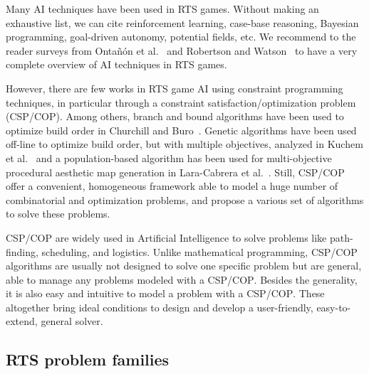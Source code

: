 \documentclass[journal]{IEEEtran}
\newcommand{\csp}{\textsc{CSP}\xspace}
\newcommand{\cop}{\textsc{COP}\xspace}
\begin{document}
Many AI  techniques have  been used  in RTS  games. Without  making an
exhaustive  list,  we  can   cite  reinforcement  learning,  case-base
reasoning,  Bayesian  programming,   goal-driven  autonomy,  potential
fields, etc. We  recommend to the reader  surveys from Onta{\~n}{\'o}n
et       al.~\cite{OntanonSURCM13}       and       Robertson       and
Watson~\cite{RobertsonW14}  to have  a  very complete  overview of  AI
techniques in RTS games.

However,  there  are  few  works  in  RTS  game  AI  using  constraint
programming   techniques,   in   particular   through   a   constraint
satisfaction/optimization problem  (\csp/\cop).  Among  others, branch
and  bound  algorithms have  been  used  to  optimize build  order  in
Churchill and Buro~\cite{ChurchillB11}.   Genetic algorithms have been
used off-line to  optimize build order, but  with multiple objectives,
analyzed  in Kuchem  et al.~\cite{KuchemPR13}  and a  population-based
algorithm has  been used for multi-objective  procedural aesthetic map
generation in  Lara-Cabrera et al.~\cite{LaraCF14}.   Still, \csp/\cop
offer a convenient, homogeneous framework  able to model a huge number
of combinatorial and optimization problems,  and propose a various set
of algorithms to solve these problems.

\csp/\cop are widely used in Artificial Intelligence to solve problems
like  path-finding, scheduling,  and  logistics.  Unlike  mathematical
programming, \csp/\cop  algorithms are  usually not designed  to solve
one  specific problem  but are  general, able  to manage  any problems
modeled with a \csp/\cop. Besides the  generality, it is also easy and
intuitive to model a problem  with a \csp/\cop. These altogether bring
ideal   conditions   to   design    and   develop   a   user-friendly,
easy-to-extend, general solver.



\subsection{RTS problem families}
\end{document}
